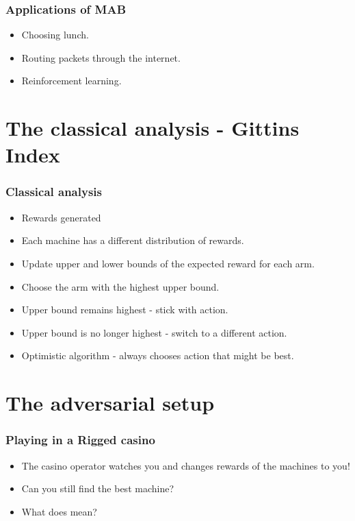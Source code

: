 \documentclass[handout]{beamer}
\begin{document}
\begin{frame}
\frametitle{Applications of MAB}
\begin{itemize}
\item Choosing lunch.
\item Routing packets through the internet.
\item Reinforcement learning.
\end{itemize}
\end{frame}


\section{The classical analysis - Gittins Index}

\begin{frame}
\frametitle{Classical analysis}
\begin{itemize}
\item Rewards generated 
\item Each machine has a different distribution of rewards.
\item Update upper and lower bounds of the expected reward for each arm.
\item Choose the arm with the highest upper bound. 
\item {} Upper bound remains highest - stick with action.
\item {} Upper bound is no longer highest -
  switch to a different action.
\item Optimistic algorithm - always chooses action that might be best.
\end{itemize}
\end{frame}

\section{The adversarial setup}

\begin{frame}
\frametitle{Playing in a Rigged casino}
\begin{itemize}
\item The casino operator watches you and changes rewards of the
  machines to  you!
\item Can you still find the best machine?
\item What does  mean?
\end{itemize}
\end{frame}
\end{document}
